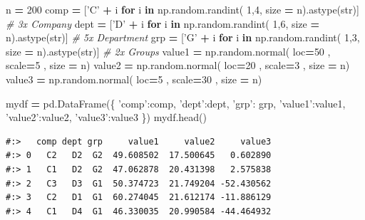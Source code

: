 \documentclass[
]{book}
\newenvironment{Shaded}{\begin{snugshade}}{\end{snugshade}}
\newcommand{\BuiltInTok}[1]{#1}
\newcommand{\CommentTok}[1]{\textcolor[rgb]{0.37,0.37,0.37}{\textit{#1}}}
\newcommand{\ControlFlowTok}[1]{\textcolor[rgb]{0.27,0.27,0.27}{\textbf{#1}}}
\newcommand{\DecValTok}[1]{\textcolor[rgb]{0.06,0.06,0.06}{#1}}
\newcommand{\KeywordTok}[1]{\textcolor[rgb]{0.27,0.27,0.27}{\textbf{#1}}}
\newcommand{\NormalTok}[1]{#1}
\newcommand{\OperatorTok}[1]{\textcolor[rgb]{0.43,0.43,0.43}{\textbf{#1}}}
\newcommand{\StringTok}[1]{\textcolor[rgb]{0.5,0.5,0.5}{#1}}
\begin{document}
\begin{Shaded}
\begin{Highlighting}[]
\NormalTok{n }\OperatorTok{=} \DecValTok{200}
\NormalTok{comp }\OperatorTok{=}\NormalTok{ [}\StringTok{'C'} \OperatorTok{+}\NormalTok{ i }\ControlFlowTok{for}\NormalTok{ i }\KeywordTok{in}\NormalTok{ np.random.randint( }\DecValTok{1}\NormalTok{,}\DecValTok{4}\NormalTok{, size  }\OperatorTok{=}\NormalTok{ n).astype(}\BuiltInTok{str}\NormalTok{)] }\CommentTok{# 3x Company}
\NormalTok{dept }\OperatorTok{=}\NormalTok{ [}\StringTok{'D'} \OperatorTok{+}\NormalTok{ i }\ControlFlowTok{for}\NormalTok{ i }\KeywordTok{in}\NormalTok{ np.random.randint( }\DecValTok{1}\NormalTok{,}\DecValTok{6}\NormalTok{, size  }\OperatorTok{=}\NormalTok{ n).astype(}\BuiltInTok{str}\NormalTok{)] }\CommentTok{# 5x Department}
\NormalTok{grp }\OperatorTok{=}\NormalTok{  [}\StringTok{'G'} \OperatorTok{+}\NormalTok{ i }\ControlFlowTok{for}\NormalTok{ i }\KeywordTok{in}\NormalTok{ np.random.randint( }\DecValTok{1}\NormalTok{,}\DecValTok{3}\NormalTok{, size  }\OperatorTok{=}\NormalTok{ n).astype(}\BuiltInTok{str}\NormalTok{)] }\CommentTok{# 2x Groups}
\NormalTok{value1 }\OperatorTok{=}\NormalTok{ np.random.normal( loc}\OperatorTok{=}\DecValTok{50}\NormalTok{ , scale}\OperatorTok{=}\DecValTok{5}\NormalTok{ , size }\OperatorTok{=}\NormalTok{ n)}
\NormalTok{value2 }\OperatorTok{=}\NormalTok{ np.random.normal( loc}\OperatorTok{=}\DecValTok{20}\NormalTok{ , scale}\OperatorTok{=}\DecValTok{3}\NormalTok{ , size }\OperatorTok{=}\NormalTok{ n)}
\NormalTok{value3 }\OperatorTok{=}\NormalTok{ np.random.normal( loc}\OperatorTok{=}\DecValTok{5}\NormalTok{ , scale}\OperatorTok{=}\DecValTok{30}\NormalTok{ , size }\OperatorTok{=}\NormalTok{ n)}

\NormalTok{mydf }\OperatorTok{=}\NormalTok{ pd.DataFrame(\{}
    \StringTok{'comp'}\NormalTok{:comp, }
    \StringTok{'dept'}\NormalTok{:dept, }
    \StringTok{'grp'}\NormalTok{: grp,}
    \StringTok{'value1'}\NormalTok{:value1, }
    \StringTok{'value2'}\NormalTok{:value2,}
    \StringTok{'value3'}\NormalTok{:value3 \})}
\NormalTok{mydf.head()}
\end{Highlighting}
\end{Shaded}

\begin{verbatim}
#:>   comp dept grp     value1     value2     value3
#:> 0   C2   D2  G2  49.608502  17.500645   0.602890
#:> 1   C1   D2  G2  47.062878  20.431398   2.575838
#:> 2   C3   D3  G1  50.374723  21.749204 -52.430562
#:> 3   C2   D1  G1  60.274045  21.612174 -11.886129
#:> 4   C1   D4  G1  46.330035  20.990584 -44.464932
\end{verbatim}
\end{document}

